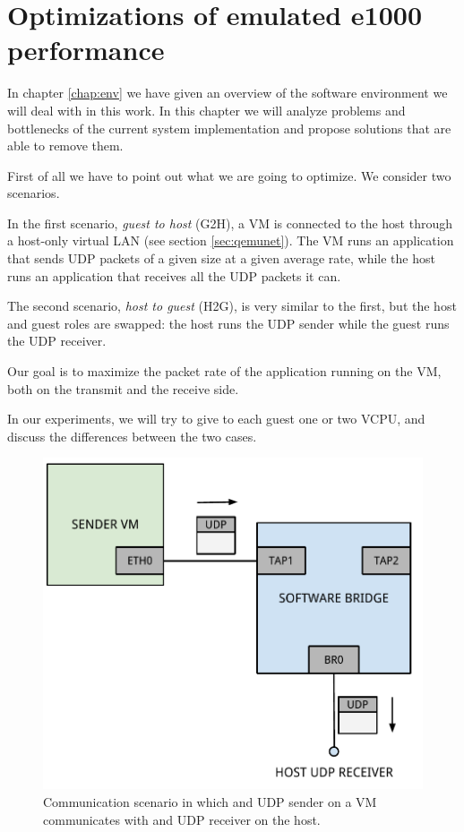 \chapter{Optimizations of emulated e1000 performance}
\label{cha:e1000-opt}
In chapter \ref{chap:env} we have given an overview of the software environment we will deal with in this work.
In this chapter we will analyze problems and bottlenecks of the current system implementation and propose solutions that are able
to remove them.

\vspace{0.5cm}

First of all we have to point out what we are going to optimize. We consider two scenarios.

In the first scenario, \emph{guest to host} (G2H), a VM is connected to the host through a host-only virtual LAN (see 
section \ref{sec:qemunet}). The VM runs an application that sends UDP packets of a given size at a given average rate, while 
the host runs an application that receives all the UDP packets it can.

The second scenario, \emph{host to guest} (H2G), is very similar to the first, but the host and guest roles are swapped: the host runs 
the UDP sender while the guest runs the UDP receiver.

Our goal is to maximize the packet rate of the application running on the VM, both on the transmit and the receive side.

\vspace{0.5cm}

In our experiments, we will try to give to each guest one or two VCPU, and discuss the differences between the two cases.

\begin{figure}[bt]
\centering
\includegraphics[scale = 0.60]{scenario-1.pdf}
\caption{Communication scenario in which and UDP sender on a VM communicates with and UDP receiver on the host.}
\label{fig:scenario-1}
\end{figure}

